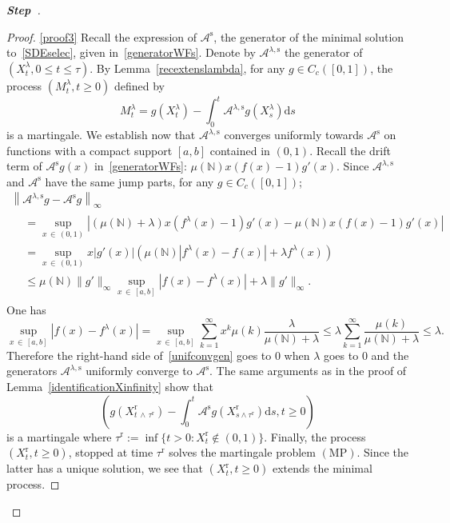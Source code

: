 \documentclass[AHL,Unicode,longabstracts,published]{cedram}
\newcommand{\ddr}{\mathrm{d}}
\newcommand{\rmr}{\mathrm{r}}
\newcommand{\rms}{\mathrm{s}}
\newcommand{\MP}{\mathrm{MP}}
\newcommand{\bbN}{\mathbb{N}}
\newcommand{\clA}{\mathcal{A}}
\newcounter{stepcount}
\newenvironment{step}{\refstepcounter{stepcount}\begin{proof}[\textbf{Step~\thestepcount}]}{\end{proof}}
\begin{document}
\begin{step}
\begin{proof}
\noindent\eqref{proof3} Recall the expression of $\clA^{\rms}$, the generator of the minimal solution to~\eqref{SDEselec}, given in~\eqref{generatorWFs}. Denote by $\clA^{\lambda,\rms}$ the generator of $(X_t^{\lambda},0\leq t\leq \tau)$. By Lemma~\ref{recextenslambda}, for any $g\in C_c([0,1])$, the process $(M_t^{\lambda},t\geq 0)$ defined by
\[
M_t^{\lambda}=g(X_t^{\lambda})-\int_{0}^{t}\clA^{\lambda, \rms}g(X_s^{\lambda})\ddr s
\]
is a martingale. We establish now that $\clA^{\lambda, \rms}$ converges uniformly towards $\clA^{\rms}$ on functions with a compact support $[a,b]$ contained in $(0,1)$. Recall the drift term of $\clA^{\rms}g(x)$ in~\eqref{generatorWFs}: $\mu(\bbN)x(f(x)-1)g'(x)$. Since $\clA^{\lambda, \rms}$ and $\clA^{\rms}$ have the same jump parts, for any $g\in C_c([0,1])$;
\begin{multline}\label{unifconvgen}
\left\|\clA^{\lambda, \rms}g-\clA^{\rms}g\right\|_\infty\\
\begin{aligned}
&=\underset{x\,\in\,(0,1)}{\sup}\left\lvert (\mu(\bbN)+\lambda)x\left(f^{\lambda}(x)-1\right)g'(x)-\mu(\bbN)x(f(x)-1)g'(x)\right \lvert \\
&=\underset{x\,\in\,(0,1)}{\sup}x|g'(x)|\left(\mu(\bbN)\left\lvert f^{\lambda}(x)-f(x)\right\lvert+\lambda f^{\lambda}(x)\right)\\
&\leq \mu(\bbN)\|g'\|_\infty \underset{x\,\in\,[a,b]}{\sup}\left|f(x)-f^{\lambda}(x)\right|+\lambda \|g'\|_\infty.
\end{aligned}
\end{multline}
One has
\[
\underset{x\,\in\,[a,b]}{\sup}\left|f(x)-f^{\lambda}(x)\right|=\underset{x\,\in\,[a,b]}{\sup}\sum_{k=1}^{\infty}x^{k}\mu(k)\frac{\lambda}{\mu(\bbN)+\lambda}\leq \lambda \sum_{k=1}^{\infty}\frac{\mu(k)}{\mu(\bbN)+\lambda}\leq \lambda.
\]
Therefore the right-hand side of~\eqref{unifconvgen} goes to $0$ when $\lambda$ goes to $0$ and the generators $\clA^{\lambda, \rms}$ uniformly converge to $\clA^{\rms}$. The same arguments as in the proof of Lemma~\ref{identificationXinfinity} show that
\[
\left(g\left(X^{\rmr}_{t\,\wedge\,\tau^{\rmr}}\right)-\int_{0}^{t}\clA^{\rms}g\left(X_{s\wedge \tau^{\rmr}}^{\rmr}\right)\ddr s, t\geq 0\right)
\]
is a martingale where $\tau^{\rmr}:=\inf\{t>0: X^{\rmr}_t\notin (0,1)\}$. Finally, the process $(X^{\rmr}_{t},t\geq 0)$, stopped at time $\tau^{\rmr}$ solves the martingale problem $(\MP)$. Since the latter has a unique solution, we see that $(X^{\rmr}_t,t\geq 0)$ extends the minimal process.
\end{proof}


\end{step}
\end{document}
